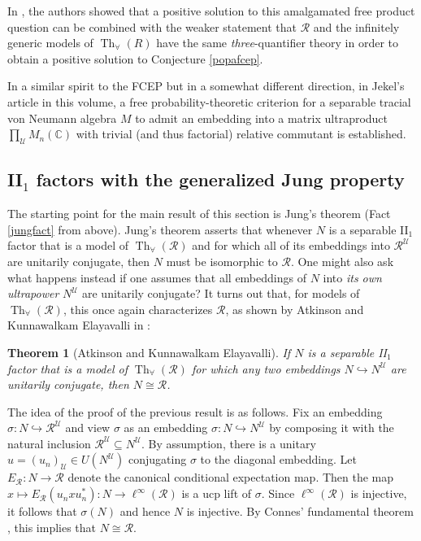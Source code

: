 \documentclass[12pt]{amsart}
\newtheorem{thm}{Theorem}[section]
\theoremstyle{definition}
\def\bb{\mathbb}
\def\bb{\mathbb}
\def\u{\mathsf 1}
\def \Th{\operatorname{Th}}
\def \R{\mathcal R}
\def \u{\mathcal U}
\begin{document}
In \cite{few}, the authors showed that a positive solution to this amalgamated free product question can be combined with the weaker statement that $\R$ and the infinitely generic models of $\Th_\forall(R)$ have the same \emph{three}-quantifier theory in order to obtain a positive solution to Conjecture \ref{popafcep}.

In a similar spirit to the FCEP but in a somewhat different direction, in Jekel's article in this volume, a free probability-theoretic criterion for a separable tracial von Neumann algebra $M$ to admit an embedding into a matrix ultraproduct $\prod_\u M_n(\bb C)$ with trivial (and thus factorial) relative commutant is established.

\subsection{II$_1$ factors with the generalized Jung property}

The starting point for the main result of this section is Jung's theorem (Fact \ref{jungfact} from above).  Jung's theorem asserts that whenever $N$ is a separable II$_1$ factor that is a model of $\Th_\forall(\R)$ and for which all of its embeddings into $\R^\u$ are unitarily conjugate, then $N$ must be isomorphic to $\R$.  One might also ask what happens instead if one assumes that all embeddings of $N$ into \emph{its own ultrapower} $N^\u$ are unitarily conjugate?  It turns out that, for models of $\Th_\forall(\R)$, this once again characterizes $\R$, as shown by Atkinson and Kunnawalkam Elayavalli in \cite[Corollary 2.7]{AK}: 

\begin{thm}[Atkinson and Kunnawalkam Elayavalli]\label{AK}
If $N$ is a separable II$_1$ factor that is a model of $\Th_\forall(\R)$ for which any two embeddings $N\hookrightarrow N^\u$ are unitarily conjugate, then $N\cong \R$.
\end{thm}

The idea of the proof of the previous result is as follows.  Fix an embedding $\sigma:N\hookrightarrow \R^\u$ and view $\sigma$ as an embedding $\sigma:N\hookrightarrow N^\u$ by composing it with the natural inclusion $\R^\u\subseteq N^\u$.  By assumption, there is a unitary $u=(u_n)_\u\in U(N^\u)$ conjugating $\sigma$ to the diagonal embedding.  Let $E_\R:N\to \R$ denote the canonical conditional expectation map.  Then the map $x\mapsto E_{\R}(u_nxu_n^*):N\to \ell^\infty(\R)$ is a ucp lift of $\sigma$.  Since $\ell^\infty(\R)$ is injective, it follows that $\sigma(N)$ and hence $N$ is injective.  By Connes' fundamental theorem \cite{connes}, this implies that $N\cong \R$.
\end{document}

